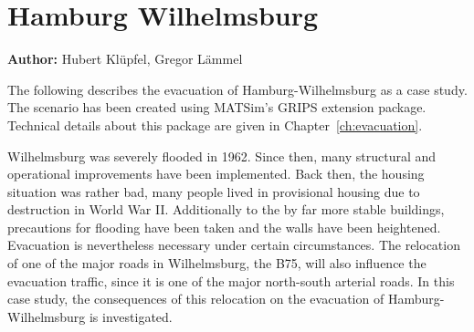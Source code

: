 
\section{Hamburg Wilhelmsburg}
\label{ch:sc:hhw}
\hfill \textbf{Author:} Hubert Klüpfel, Gregor Lämmel

The following describes the evacuation of Hamburg-Wilhelmsburg as a case study. The scenario has been created using MATSim's GRIPS extension package. Technical details about this package are given in Chapter~\ref{ch:evacuation}. 

Wilhelmsburg was severely flooded in 1962. Since then, many structural and operational improvements have been implemented. Back then, the housing situation was rather bad, many people lived in provisional housing due to destruction in World War II. Additionally to the by far more stable buildings, precautions for flooding have been taken and the walls have been heightened. Evacuation is nevertheless necessary under certain circumstances. The relocation of one of the major roads in Wilhelmsburg, the B75, will also influence the evacuation traffic, since it is one of the major north-south arterial roads. In this case study, the consequences of this relocation on the evacuation of Hamburg-Wilhelmsburg is investigated.

